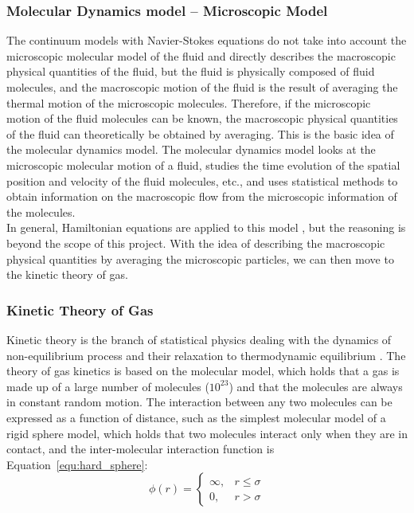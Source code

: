 \subsubsection{Molecular Dynamics model -- Microscopic Model} \label{sec:HE}
The continuum models with Navier-Stokes equations do not take into account the microscopic molecular model of the fluid and directly describes the macroscopic physical quantities of the fluid, but the fluid is physically composed of fluid molecules, and the macroscopic motion of the fluid is the result of averaging the thermal motion of the microscopic molecules. Therefore, if the microscopic motion of the fluid molecules can be known, the macroscopic physical quantities of the fluid can theoretically be obtained by averaging. This is the basic idea of the molecular dynamics model. The molecular dynamics model looks at the microscopic molecular motion of a fluid, studies the time evolution of the spatial position and velocity of the fluid molecules, etc., and uses statistical methods to obtain information on the macroscopic flow from the microscopic information of the molecules.\\

In general, Hamiltonian equations are applied to this model \cite{salmon1988hamiltonian}, but the reasoning is beyond the scope of this project. With the idea of describing the macroscopic physical quantities by averaging the microscopic particles, we can then move to the kinetic theory of gas.

\subsubsection{Kinetic Theory of Gas}\label{sec:BE}
Kinetic theory is the branch of statistical physics dealing with the dynamics of non-equilibrium process and their relaxation to thermodynamic equilibrium \cite{succi2001lattice}. The theory of gas kinetics is based on the molecular model, which holds that a gas is made up of a large number of molecules ($10^{23}$) and that the molecules are always in constant random motion. The interaction between any two molecules can be expressed as a function of distance, such as the simplest molecular model of a rigid sphere model, which holds that two molecules interact only when they are in contact, and the inter-molecular interaction function is Equation~\ref{equ:hard_sphere}:\\

\begin{equation}
\label{equ:hard_sphere}
\phi  (r) = \left\{\begin{matrix}
\infty, & r \leqslant \sigma \\ 
0, & r > \sigma
\end{matrix}\right.
\end{equation}

